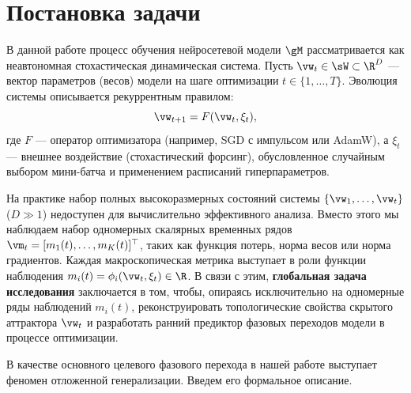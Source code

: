 \documentclass{article}
\begin{document}
\section{Постановка задачи}\label{sec:problem}

В данной работе процесс обучения нейросетевой модели $\gM$ рассматривается как неавтономная стохастическая динамическая система. Пусть $\vw_t \in \sW \subset \R^D$ — вектор параметров (весов) модели на шаге оптимизации $t \in \{1, \dots, T\}$. Эволюция системы описывается рекуррентным правилом:
\begin{equation}
    \vw_{t+1} = F(\vw_t, \xi_t),
\end{equation}
где $F$ — оператор оптимизатора (например, SGD с импульсом или AdamW), а $\xi_t$ — внешнее воздействие (стохастический форсинг), обусловленное случайным выбором мини-батча и применением расписаний гиперпараметров.

На практике набор полных высокоразмерных состояний системы $\{\vw_1, \dots, \vw_t\}$ ($D \gg 1$) недоступен для вычислительно эффективного анализа. Вместо этого мы наблюдаем набор одномерных скалярных временных рядов $\vm_t =[m_1(t), \dots, m_K(t)]^\top$, таких как функция потерь, норма весов или норма градиентов. Каждая макроскопическая метрика выступает в роли функции наблюдения $m_i(t) = \phi_i(\vw_t, \xi_t) \in \R$. В связи с этим, \textbf{глобальная задача исследования} заключается в том, чтобы, опираясь исключительно на одномерные ряды наблюдений $m_i(t)$, реконструировать топологические свойства скрытого аттрактора $\vw_t$ и разработать ранний предиктор фазовых переходов модели в процессе оптимизации.

В качестве основного целевого фазового перехода в нашей работе выступает феномен отложенной генерализации. Введем его формальное описание.
\end{document}
